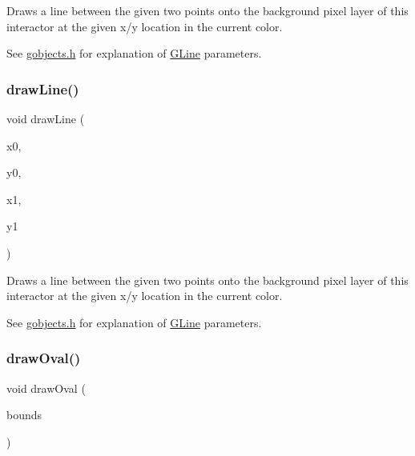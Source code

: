 Draws a line between the given two points onto the background pixel layer of this interactor at the given x/y location in the current color. 

See \mbox{\hyperlink{gobjects_8h_source}{gobjects.\+h}} for explanation of \mbox{\hyperlink{classGLine}{G\+Line}} parameters. \mbox{\label{classGDrawingSurface_aff299fe83178d2f3ce8c08c06b583484}} 
\subsubsection{\texorpdfstring{draw\+Line()}{drawLine()}\hspace{0.1cm}{\footnotesize\ttfamily [2/2]}}
{\footnotesize\ttfamily void draw\+Line (\begin{DoxyParamCaption}\item[{double}]{x0,  }\item[{double}]{y0,  }\item[{double}]{x1,  }\item[{double}]{y1 }\end{DoxyParamCaption})\hspace{0.3cm}{\ttfamily [virtual]}}



Draws a line between the given two points onto the background pixel layer of this interactor at the given x/y location in the current color. 

See \mbox{\hyperlink{gobjects_8h_source}{gobjects.\+h}} for explanation of \mbox{\hyperlink{classGLine}{G\+Line}} parameters. \mbox{\label{classGDrawingSurface_a8adc13027efe311b4a6a715205b8bc46}} 
\subsubsection{\texorpdfstring{draw\+Oval()}{drawOval()}\hspace{0.1cm}{\footnotesize\ttfamily [1/2]}}
{\footnotesize\ttfamily void draw\+Oval (\begin{DoxyParamCaption}\item[{const \mbox{\hyperlink{classGRectangle}{G\+Rectangle}} \&}]{bounds }\end{DoxyParamCaption})\hspace{0.3cm}{\ttfamily [virtual]}}




